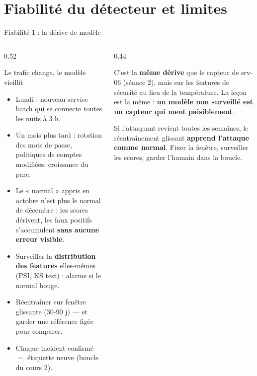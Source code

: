 \section{Fiabilité du détecteur et limites}

\begin{frame}{Fiabilité 1 : la dérive de modèle}
\begin{columns}[t]
\begin{column}{0.52\textwidth}
\begin{block}{Le trafic change, le modèle vieillit}
\begin{itemize}
\item Lundi : nouveau service batch qui se connecte toutes les nuits à 3 h.
\item Un mois plus tard : rotation des mots de passe, politiques de comptes
modifiées, croissance du parc.
\item Le « normal » appris en octobre n'est plus le normal de décembre :
les scores dérivent, les faux positifs s'accumulent \textbf{sans aucune
erreur visible}.
\end{itemize}
\end{block}
\begin{ebox}
\begin{itemize}
\item Surveiller la \textbf{distribution des features} elles-mêmes
(PSI, KS test) : alarme si le normal bouge.
\item Réentraîner sur fenêtre glissante (30-90 j) --- et garder une
référence figée pour comparer.
\item Chaque incident confirmé $=$ étiquette neuve (boucle du cours 2).
\end{itemize}
\end{ebox}
\end{column}
\begin{column}{0.44\textwidth}
\begin{kbox}
C'est la \textbf{même dérive} que le capteur de srv-06 (séance 2), mais sur
les features de sécurité au lieu de la température. La leçon est la même :
\textbf{un modèle non surveillé est un capteur qui ment paisiblement}.
\end{kbox}
\begin{wbox}
Si l'attaquant revient toutes les semaines, le réentraînement glissant
\textbf{apprend l'attaque comme normal}. Fixer la fenêtre, surveiller les
scores, garder l'humain dans la boucle.
\end{wbox}
\end{column}
\end{columns}
\end{frame}

